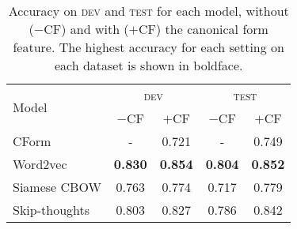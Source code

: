 \documentclass[11pt,a4paper]{article}
\newcommand{\dev}{\textsc{dev}\xspace}
\newcommand{\test}{\textsc{test}\xspace}
\begin{document}
\begin{table}
\setlength{\tabcolsep}{0.4em}
\begin{center}
\begin{tabular}{l|cc|cc}
\multirow{2}{*}{Model}  &  \multicolumn{2}{c}{\dev}  &  \multicolumn{2}{c}{\test}\\
\cline{2-5}
& $-$CF & $+$CF & $-$CF & $+$CF\\
\hline
CForm & - & 0.721 & - & 0.749\\
Word2vec &\textbf{0.830} &\textbf{0.854}& \textbf{0.804} &\textbf{0.852}\\
Siamese CBOW &0.763 &0.774 & 0.717 &0.779\\
Skip-thoughts &0.803 &0.827& 0.786 &0.842\\
\end{tabular}
\caption{Accuracy on \dev and \test for each model, without ($-$CF)
  and with ($+$CF) the canonical form feature. The highest accuracy
  for each setting on each dataset is shown in
  boldface. \label{results}}
\end{center}
\end{table}
\end{document}
